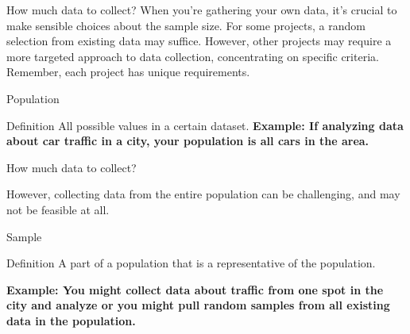 \documentclass[aspectratio=169,xcolor=dvipsnames,svgnames,x11names,fleqn]{beamer}
\begin{document}
\begin{frame}[c]{How much data to collect?}
When you’re gathering your own data, it’s crucial to make sensible choices about the sample size. For some projects, a random selection from existing data may suffice. However, other projects may require a more targeted approach to data collection, concentrating on specific criteria. Remember, each project has unique requirements.
\end{frame}


\begin{frame}[c]{Population}
\begin{gradblock}{Definition}
    All possible values in a certain dataset.
   \textbf{Example: If analyzing data about car traffic in a city, your population is all cars in the area.}
\end{gradblock}
\end{frame}



\begin{frame}[c]{How much data to collect?}
\Large
\begin{center}
    However, collecting data from the entire population can be challenging, and may not be feasible at all.
\end{center}

\end{frame}


\begin{frame}[c]{Sample}


\begin{gradblock}{Definition}
    A part of a population that is a representative of the population.

   \textbf{Example: You might collect data about traffic from one spot in the city and analyze or you might pull random samples from all existing data in the population.}
\end{gradblock}

\end{frame}
\end{document}
